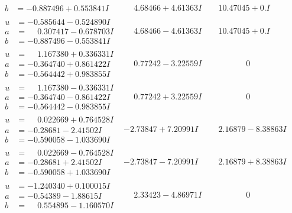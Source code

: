 \documentclass[1p]{elsarticle_modified}
\theoremstyle{definition}
\begin{document}
$$\begin{array}{c|c|c}
\begin{aligned}
b &= -0.887496 + 0.553841 I\end{aligned}
 & \phantom{-}4.68466 + 4.61363 I & \phantom{-}10.47045 + 0. I\phantom{ +0.000000I} \\ \hline\begin{aligned}
u &= -0.585644 - 0.524890 I \\
a &= \phantom{-}0.307417 - 0.678703 I \\
b &= -0.887496 - 0.553841 I\end{aligned}
 & \phantom{-}4.68466 - 4.61363 I & \phantom{-}10.47045 + 0. I\phantom{ +0.000000I} \\ \hline\begin{aligned}
u &= \phantom{-}1.167380 + 0.336331 I \\
a &= -0.364740 + 0.861422 I \\
b &= -0.564442 + 0.983855 I\end{aligned}
 & \phantom{-}0.77242 - 3.22559 I & \phantom{-0.000000 } 0 \\ \hline\begin{aligned}
u &= \phantom{-}1.167380 - 0.336331 I \\
a &= -0.364740 - 0.861422 I \\
b &= -0.564442 - 0.983855 I\end{aligned}
 & \phantom{-}0.77242 + 3.22559 I & \phantom{-0.000000 } 0 \\ \hline\begin{aligned}
u &= \phantom{-}0.022669 + 0.764528 I \\
a &= -0.28681 - 2.41502 I \\
b &= -0.590058 - 1.033690 I\end{aligned}
 & -2.73847 + 7.20991 I & \phantom{-}2.16879 - 8.38863 I \\ \hline\begin{aligned}
u &= \phantom{-}0.022669 - 0.764528 I \\
a &= -0.28681 + 2.41502 I \\
b &= -0.590058 + 1.033690 I\end{aligned}
 & -2.73847 - 7.20991 I & \phantom{-}2.16879 + 8.38863 I \\ \hline\begin{aligned}
u &= -1.240340 + 0.100015 I \\
a &= -0.54389 - 1.88615 I \\
b &= \phantom{-}0.554895 - 1.160570 I\end{aligned}
 & \phantom{-}2.33423 - 4.86971 I & \phantom{-0.000000 } 0 \\ \hline\begin{aligned}

\end{aligned}
\end{array}$$
\end{document}
